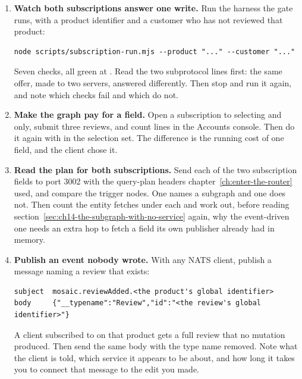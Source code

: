 \begin{enumerate}
  \item \textbf{Watch both subscriptions answer one write.} Run the harness
  the gate runs, with a product identifier and a customer who has not reviewed
  that product:

  \begin{verbatim}
node scripts/subscription-run.mjs --product "..." --customer "..."
  \end{verbatim}

  Seven checks, all green at . Read the two subprotocol lines first:
  the same offer, made to two servers, answered differently. Then stop
   and run it again, and note which checks fail and which do
  not.

  \item \textbf{Make the graph pay for a field.} Open a subscription to
   selecting  and  only, submit three
  reviews, and count  lines in the Accounts
  console. Then do it again with  in the
  selection set. The difference is the running cost of one field, and the
  client chose it.

  \item \textbf{Read the plan for both subscriptions.} Send each of the two
  subscription fields to port 3002 with the query-plan headers
  chapter~\ref{ch:enter-the-router} used, and compare the trigger nodes. One
  names a subgraph and one does not. Then count the entity fetches under each
  and work out, before reading
  section~\ref{sec:ch14-the-subgraph-with-no-service} again, why the
  event-driven one needs an extra hop to fetch a field its own publisher
  already had in memory.

  \item \textbf{Publish an event nobody wrote.} With any NATS client, publish
  a message naming a review that exists:

  \begin{verbatim}
subject  mosaic.reviewAdded.<the product's global identifier>
body     {"__typename":"Review","id":"<the review's global identifier>"}
  \end{verbatim}

  A client subscribed to  on that product gets a full
  review that no mutation produced. Then send the same body with the type name
  removed. Note what the client is told, which service it appears to be about,
  and how long it takes you to connect that message to the edit you made.


\end{enumerate}
